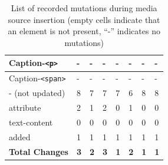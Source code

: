 \documentclass[a4paper, 10pt]{article}
\begin{document}
\begin{table}[!ht]
\begin{adjustbox}{angle=90}
\begin{tabular}{|l|l|l|l|l|l|l|l|}
      Caption-\verb|<p>|              & -                 & -               & -                   & -             & -               & -               & -               \\ \hline
      Caption-\verb|<span>|           & -                 & -               & -                   & -             & -               & -               & -               \\ \hline
      \hline
      - (not updated)                 & 8                 & 7               & 7                   & 7             & 6               & 8               & 8               \\ \hline
      \hline
      attribute                       & 2                 & 1               & 2                   & 0             & 1               & 0               & 0               \\ \hline
      text-content                    & 0                 & 0               & 0                   & 0             & 0               & 0               & 0               \\ \hline
      added                           & 1                 & 1               & 1                   & 1             & 1               & 1               & 1               \\ \hline
      \hline
      \textbf{Total Changes}          & \textbf{3}        & \textbf{2}      & \textbf{3}          & \textbf{1}    & \textbf{2}      & \textbf{1}      & \textbf{1}      \\ \hline
      \end{tabular}
  \end{adjustbox}
  \caption{List of recorded mutations during media source insertion (empty cells indicate that an element is not present, \enquote{-} indicates no mutations)}
  \label{tab:mutations:mediaSourceInsertion}
\end{table}
\end{document}
